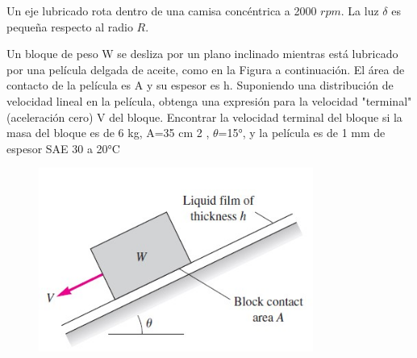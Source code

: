 \documentclass[12pt, a4paper]{exam}
\begin{document}
\begin{questions}
	\question Un eje lubricado rota dentro de una camisa concéntrica a 2000 $rpm$. La luz $\delta$ es pequeña respecto al radio $R$. 
	\vspace{0.2in}


 
 
	\question Un bloque de peso W se desliza por un plano inclinado mientras está lubricado por una película delgada de aceite, como en la Figura a continuación. El área de contacto de la película es A y su espesor es h. Suponiendo una distribución de velocidad lineal en la película, obtenga una expresión para la velocidad "terminal" (aceleración cero) V del bloque. Encontrar la velocidad terminal del bloque si la masa del bloque es de 6 kg, A=35 cm 2 , $\theta$=15°, y la película es de 1 mm de espesor SAE 30 a 20°C
	

    \begin{figure}[h]
    \includegraphics[width=9cm]{BLOQUE.jpg}
    \centering
    \end{figure}		


\end{questions}
\end{document}
